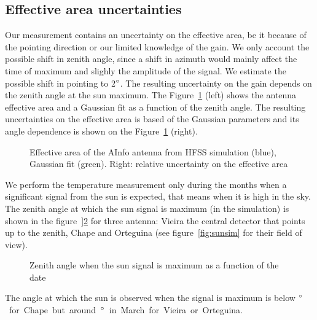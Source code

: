 \subsection{Effective area uncertainties}
Our measurement contains  an uncertainty on the effective  area, be it
because  of the  pointing direction  or our  limited knowledge  of the
gain.  We  only account  the possible shift  in zenith angle,  since a
shift in azimuth  would mainly affect the time  of maximum and slighly
the  amplitude of  the  signal.   We estimate  the  possible shift  in
pointing to  2$\rm ^{\circ}$.  The  resulting uncertainty on  the gain
depends   on   the   zenith   angle   at   the   sun   maximum.    The
Figure~\ref{fig:aeffuncert}  (left) shows  the antenna  effective area
and a  Gaussian fit as a  function of the zenith  angle. The resulting
uncertainties  on  the  effective   area  is  based  of  the  Gaussian
parameters   and    its   angle    dependence   is   shown    on   the
Figure~\ref{fig:aeffuncert} (right).
\begin{figure}[!ht]
 \centering
 \hspace*{-3ex}
 \caption{Effective  area of  the AInfo  antenna from  HFSS simulation
   (blue), Gaussian  fit (green).  Right: relative uncertainty  on the
   effective area}
 \label{fig:aeffuncert}
\end{figure}
We perform the  temperature measurement only during the  months when a
significant signal  from the  sun is expected,  that means when  it is
high in the  sky. The zenith angle at which the  sun signal is maximum
(in the simulation) is  shown in the figure~]\ref{fig:zenithofmax} for
  three antenna:  Vieira the  central detector that  points up  to the
  zenith, Chape  and Orteguina (see  figure~\ref{fig:sunsim} for their
  field of view).
\begin{figure}[!ht]
 \centering
 \hspace*{-3ex}
 \caption{Zenith angle when the sun signal is maximum as a function of
   the date}
 \label{fig:zenithofmax}
\end{figure}
The angle at  which the sun is observed when the  signal is maximum is
below  \unit[10]{$\rm  ^{\circ}$} for  Chape  but  around \unit[15  to
  20]{$\rm ^{\circ}$} in March for Vieira or Orteguina.


